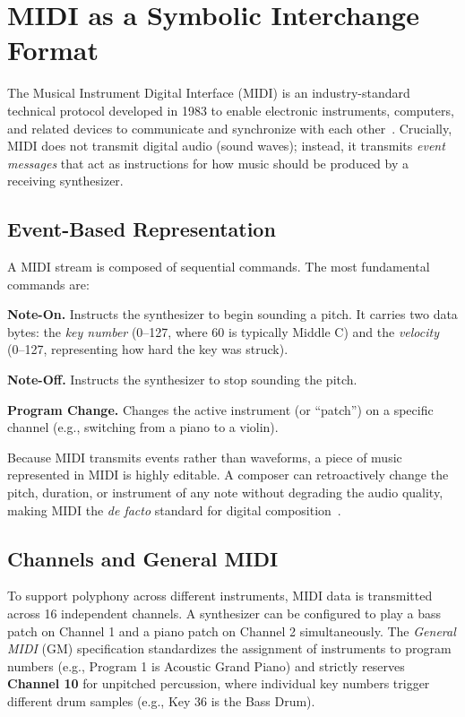 \section{MIDI as a Symbolic Interchange Format}\label{sec:midi-background}

The Musical Instrument Digital Interface (MIDI) is an industry-standard technical protocol developed in 1983
to enable electronic instruments, computers, and related devices to communicate and synchronize with each
other~\cite{Moog_1986}.
Crucially, MIDI does not transmit digital audio (sound waves); instead, it transmits \textit{event messages} that act as
instructions for how music should be produced by a receiving synthesizer.

\subsection{Event-Based Representation}\label{detail-subsec:event-based-representation}

A MIDI stream is composed of sequential commands.
The most fundamental commands are:

\noindent \textbf{Note-On.} Instructs the synthesizer to begin sounding a pitch.
It carries two data bytes: the \textit{key number} (0--127, where 60 is typically Middle C) and the
\textit{velocity} (0--127, representing how hard the key was struck).

\noindent \textbf{Note-Off.} Instructs the synthesizer to stop sounding the pitch.

\noindent \textbf{Program Change.} Changes the active instrument (or ``patch'') on a specific channel (e.g., switching
from a piano to a violin).

Because MIDI transmits events rather than waveforms, a piece of music represented in MIDI is highly editable.
A composer can retroactively change the pitch, duration, or instrument of any note without degrading the audio quality,
making MIDI the \textit{de facto} standard for digital composition~\cite{Moog_1986}.

\subsection{Channels and General MIDI}\label{detail-subsec:channels-and-general-midi}

To support polyphony across different instruments, MIDI data is transmitted across 16 independent channels.
A synthesizer can be configured to play a bass patch on Channel 1 and a piano patch on Channel 2 simultaneously.
The \textit{General MIDI} (GM) specification standardizes the assignment of instruments to program numbers (e.g.,
Program 1 is Acoustic Grand Piano) and strictly reserves \textbf{Channel 10} for unpitched percussion, where individual
key numbers trigger different drum samples (e.g., Key 36 is the Bass Drum).


